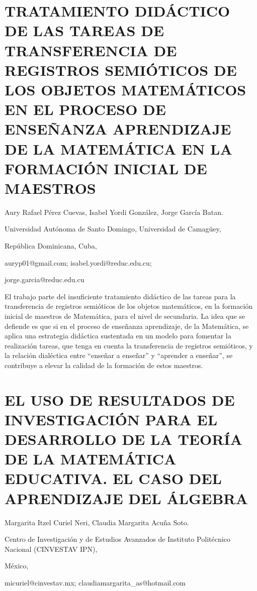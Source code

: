 \section{TRATAMIENTO DIDÁCTICO DE LAS TAREAS DE TRANSFERENCIA DE REGISTROS
SEMIÓTICOS DE LOS OBJETOS MATEMÁTICOS EN EL PROCESO DE ENSEÑANZA APRENDIZAJE
DE LA MATEMÁTICA EN LA FORMACIÓN INICIAL DE MAESTROS }

\begin{datos}

Aury Rafael Pérez Cuevas, Isabel Yordi González, Jorge García Batan.

Universidad Autónoma de Santo Domingo, Universidad de Camagüey,

República Dominicana, Cuba,

auryp01@gmail.com; isabel.yordi@reduc.edu.cu; 

jorge.garcia@reduc.edu.cu 

\end{datos}

El trabajo parte del insuficiente tratamiento didáctico de las tareas
para la transferencia de registros semióticos de los objetos matemáticos,
en la formación inicial de maestros de Matemática, para el nivel de
secundaria. La idea que se defiende es que si en el proceso de enseñanza
aprendizaje, de la Matemática, se aplica una estrategia didáctica
sustentada en un modelo para fomentar la realización tareas, que tenga
en cuenta la transferencia de registros semióticos, y la relación
dialéctica entre “enseñar a enseñar” y “aprender a enseñar”, se contribuye
a elevar la calidad de la formación de estos maestros. 


\section{EL USO DE RESULTADOS DE INVESTIGACIÓN PARA EL DESARROLLO DE LA TEORÍA
DE LA MATEMÁTICA EDUCATIVA. EL CASO DEL APRENDIZAJE DEL ÁLGEBRA}

\begin{datos}

Margarita Itzel Curiel Neri, Claudia Margarita Acuña Soto.

Centro de Investigación y de Estudios Avanzados de Instituto Politécnico
Nacional (CINVESTAV IPN),

México,

micuriel@cinvestav.mx; claudiamargarita\_as@hotmail.com 

\end{datos}

